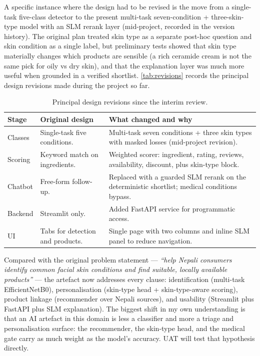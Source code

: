\documentclass[11pt,a4paper]{article}
\begin{document}
A specific instance where the design had to be revised is the move
from a single-task five-class detector to the present multi-task
seven-condition + three-skin-type model with an SLM rerank layer
(mid-project, recorded in the version history). The original plan
treated skin type as a
separate post-hoc question and skin condition as a single label, but
preliminary tests showed that skin type materially changes which
products are sensible (a rich ceramide cream is not the same pick
for oily vs dry skin), and that the explanation layer was much more
useful when grounded in a verified shortlist. \autoref{tab:revisions}
records the principal design revisions made during the project so
far.

\begin{table}[!ht]
  \centering
  \caption{Principal design revisions since the interim review.}
  \label{tab:revisions}
  \begin{tabularx}{\linewidth}{@{}p{1.8cm} p{4.0cm} X@{}}
    \toprule
    \textbf{Stage} & \textbf{Original design} & \textbf{What changed and why} \\
    \midrule
    Classes   & Single-task five conditions.        & Multi-task seven conditions + three skin types with masked losses (mid-project revision). \\
    Scoring   & Keyword match on ingredients.       & Weighted scorer: ingredient, rating, reviews, availability, discount, plus skin-type block. \\
    Chatbot   & Free-form follow-up.                 & Replaced with a guarded SLM rerank on the deterministic shortlist; medical conditions bypass. \\
    Backend   & Streamlit only.                      & Added FastAPI service for programmatic access. \\
    UI        & Tabs for detection and products.     & Single page with two columns and inline SLM panel to reduce navigation. \\
    \bottomrule
  \end{tabularx}
\end{table}

Compared with the original problem statement ---
\emph{``help Nepali consumers identify common facial skin conditions
and find suitable, locally available products''} --- the artefact now
addresses every clause: identification (multi-task EfficientNetB0),
personalisation (skin-type head + skin-type-aware scoring), product
linkage (recommender over Nepali sources), and usability (Streamlit
plus FastAPI plus SLM explanation). The biggest shift in my own
understanding is that an AI artefact in this domain is less a
classifier and more a triage and personalisation surface: the
recommender, the skin-type head, and the medical gate carry as much
weight as the model's accuracy. UAT will test that hypothesis
directly.
\end{document}

